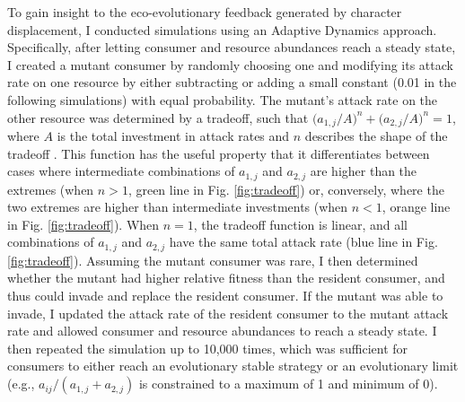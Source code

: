 \documentclass[11pt,]{article}
\begin{document}
To gain insight to the eco-evolutionary feedback generated by character
displacement, I conducted simulations using an Adaptive Dynamics
approach. Specifically, after letting consumer and resource abundances
reach a steady state, I created a mutant consumer by randomly choosing
one and modifying its attack rate on one resource by either subtracting
or adding a small constant (0.01 in the following simulations) with
equal probability. The mutant's attack rate on the other resource was
determined by a tradeoff, such that
\(\big(a_{\text{1},j}/{A}\big)^n+\big(a_{\text{2},j}/{A}\big)^n=1\),
where \(A\) is the total investment in attack rates and \(n\) describes
the shape of the tradeoff \citep{Sargent2006}. This function has the
useful property that it differentiates between cases where intermediate
combinations of \(a_{\text{1},j}\) and \(a_{\text{2},j}\) are higher
than the extremes (when \(n>1\), green line in Fig. \ref{fig:tradeoff})
or, conversely, where the two extremes are higher than intermediate
investments (when \(n<1\), orange line in Fig. \ref{fig:tradeoff}). When
\(n=1\), the tradeoff function is linear, and all combinations of
\(a_{\text{1},j}\) and \(a_{\text{2},j}\) have the same total attack
rate (blue line in Fig. \ref{fig:tradeoff}). Assuming the mutant
consumer was rare, I then determined whether the mutant had higher
relative fitness than the resident consumer, and thus could invade and
replace the resident consumer. If the mutant was able to invade, I
updated the attack rate of the resident consumer to the mutant attack
rate and allowed consumer and resource abundances to reach a steady
state. I then repeated the simulation up to 10,000 times, which was
sufficient for consumers to either reach an evolutionary stable strategy
\citep[ESS,][]{Smith1973} or an evolutionary limit (e.g.,
\(a_{ij}/(a_{\text{1},j}+a_{\text{2},j})\) is constrained to a maximum
of 1 and minimum of 0).
\end{document}
